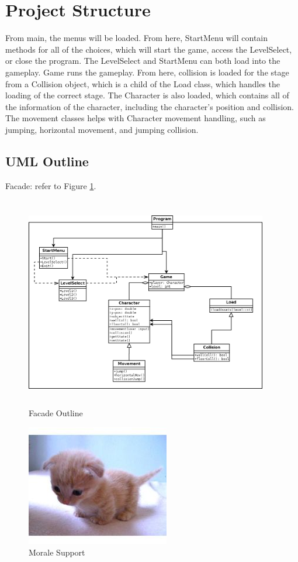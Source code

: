\documentclass[10pt,conference,onecolumn,compsoc]{IEEEtran}
\begin{document}
\section{Project Structure}
From main, the menus will be loaded. From here, StartMenu will contain methods for all of the choices, which will start the game, access the LevelSelect, or close the program. The LevelSelect and StartMenu can both load into the gameplay. Game runs the gameplay. From here, collision is loaded for the stage from a Collision object, which is a child of the Load class, which handles the loading of the correct stage. The Character is also loaded, which contains all of the information of the character, including the character’s position and collision. The movement classes helps with Character movement handling, such as jumping, horizontal movement, and jumping collision.

\subsection{UML Outline}
Facade: refer to Figure \ref{Facade}.
\begin{figure}[ht!]
\includegraphics[height=350px, width=400px]{Facade.png}
\caption{Facade Outline}
\label{Facade}
\end{figure}

\begin{figure}[ht!]
\includegraphics[scale=1.5]{cat2.jpg}
\caption{Morale Support}
\label{cat2}
\end{figure}
\end{document}
